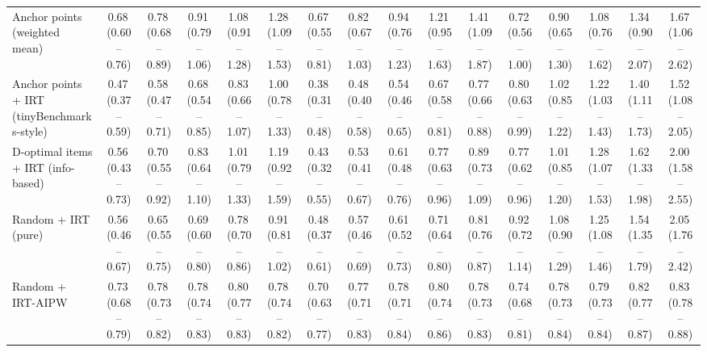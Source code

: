 \begin{tabular}{lccccccccccccccc}
Anchor points (weighted mean) & 0.68\,\scriptsize(0.60--0.76) & 0.78\,\scriptsize(0.68--0.89) & 0.91\,\scriptsize(0.79--1.06) & 1.08\,\scriptsize(0.91--1.28) & 1.28\,\scriptsize(1.09--1.53) & 0.67\,\scriptsize(0.55--0.81) & 0.82\,\scriptsize(0.67--1.03) & 0.94\,\scriptsize(0.76--1.23) & 1.21\,\scriptsize(0.95--1.63) & 1.41\,\scriptsize(1.09--1.87) & 0.72\,\scriptsize(0.56--1.00) & 0.90\,\scriptsize(0.65--1.30) & 1.08\,\scriptsize(0.76--1.62) & 1.34\,\scriptsize(0.90--2.07) & 1.67\,\scriptsize(1.06--2.62) \\
Anchor points + IRT (tinyBenchmarks-style) & 0.47\,\scriptsize(0.37--0.59) & 0.58\,\scriptsize(0.47--0.71) & 0.68\,\scriptsize(0.54--0.85) & 0.83\,\scriptsize(0.66--1.07) & 1.00\,\scriptsize(0.78--1.33) & 0.38\,\scriptsize(0.31--0.48) & 0.48\,\scriptsize(0.40--0.58) & 0.54\,\scriptsize(0.46--0.65) & 0.67\,\scriptsize(0.58--0.81) & 0.77\,\scriptsize(0.66--0.88) & 0.80\,\scriptsize(0.63--0.99) & 1.02\,\scriptsize(0.85--1.22) & 1.22\,\scriptsize(1.03--1.43) & 1.40\,\scriptsize(1.11--1.73) & 1.52\,\scriptsize(1.08--2.05) \\
D-optimal items + IRT (info-based) & 0.56\,\scriptsize(0.43--0.73) & 0.70\,\scriptsize(0.55--0.92) & 0.83\,\scriptsize(0.64--1.10) & 1.01\,\scriptsize(0.79--1.33) & 1.19\,\scriptsize(0.92--1.59) & 0.43\,\scriptsize(0.32--0.55) & 0.53\,\scriptsize(0.41--0.67) & 0.61\,\scriptsize(0.48--0.76) & 0.77\,\scriptsize(0.63--0.96) & 0.89\,\scriptsize(0.73--1.09) & 0.77\,\scriptsize(0.62--0.96) & 1.01\,\scriptsize(0.85--1.20) & 1.28\,\scriptsize(1.07--1.53) & 1.62\,\scriptsize(1.33--1.98) & 2.00\,\scriptsize(1.58--2.55) \\
Random + IRT (pure) & 0.56\,\scriptsize(0.46--0.67) & 0.65\,\scriptsize(0.55--0.75) & 0.69\,\scriptsize(0.60--0.80) & 0.78\,\scriptsize(0.70--0.86) & 0.91\,\scriptsize(0.81--1.02) & 0.48\,\scriptsize(0.37--0.61) & 0.57\,\scriptsize(0.46--0.69) & 0.61\,\scriptsize(0.52--0.73) & 0.71\,\scriptsize(0.64--0.80) & 0.81\,\scriptsize(0.76--0.87) & 0.92\,\scriptsize(0.72--1.14) & 1.08\,\scriptsize(0.90--1.29) & 1.25\,\scriptsize(1.08--1.46) & 1.54\,\scriptsize(1.35--1.79) & 2.05\,\scriptsize(1.76--2.42) \\
Random + IRT-AIPW & 0.73\,\scriptsize(0.68--0.79) & 0.78\,\scriptsize(0.73--0.82) & 0.78\,\scriptsize(0.74--0.83) & 0.80\,\scriptsize(0.77--0.83) & 0.78\,\scriptsize(0.74--0.82) & 0.70\,\scriptsize(0.63--0.77) & 0.77\,\scriptsize(0.71--0.83) & 0.78\,\scriptsize(0.71--0.84) & 0.80\,\scriptsize(0.74--0.86) & 0.78\,\scriptsize(0.73--0.83) & 0.74\,\scriptsize(0.68--0.81) & 0.78\,\scriptsize(0.73--0.84) & 0.79\,\scriptsize(0.73--0.84) & 0.82\,\scriptsize(0.77--0.87) & 0.83\,\scriptsize(0.78--0.88) \\

\end{tabular}
